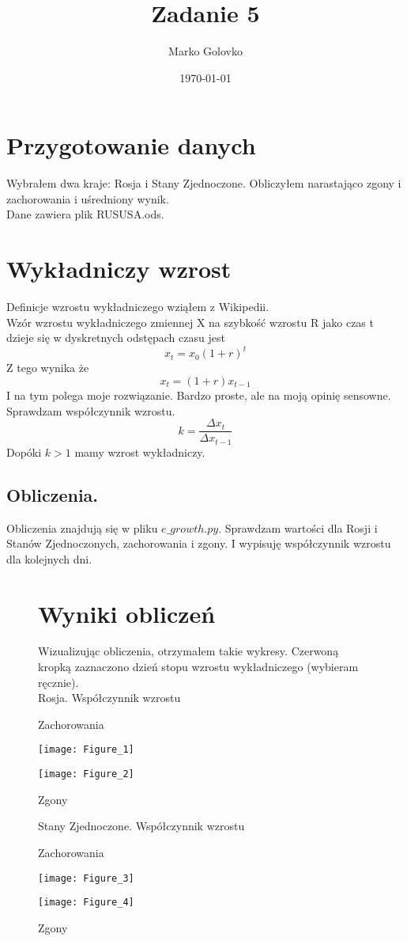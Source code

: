 \documentclass[12pt]{article}
\title{Zadanie 5}
\author{Marko Golovko}
\date{\today}
\begin{document}
\maketitle

\section*{Przygotowanie danych}
Wybrałem dwa kraje: Rosja i Stany Zjednoczone. Obliczyłem narastająco zgony i zachorowania i uśredniony wynik.\\
Dane zawiera plik RUSUSA.ods.

\section*{Wykładniczy wzrost}
Definicje wzrostu wykładniczego wziąłem z Wikipedii.\\
Wzór wzrostu wykładniczego zmiennej X na szybkość wzrostu R jako czas t dzieje się w dyskretnych odstępach czasu jest
$$ x_{t} = x_{0}(1 + r)^{t}$$
Z tego wynika że
$$ x_{t} = (1 + r)x_{t-1} $$
I na tym polega moje rozwiązanie. Bardzo proste, ale na moją opinię sensowne. Sprawdzam współczynnik wzrostu.
$$ k = \frac{\Delta x_{t}}{\Delta x_{t-1}} $$
Dopóki $k > 1$ mamy wzrost wykładniczy.

\subsection*{Obliczenia.}
Obliczenia znajdują się w pliku $e\_growth.py$. Sprawdzam wartości dla Rosji i Stanów Zjednoczonych, zachorowania i zgony.
I wypisuję współczynnik wzrostu dla kolejnych dni.


\begin{figure}[hbt!]
\section*{Wyniki obliczeń}
Wizualizując obliczenia, otrzymałem takie wykresy. Czerwoną kropką zaznaczono dzień stopu wzrostu wykładniczego (wybieram ręcznie). \\
\centering Rosja. Współczynnik wzrostu
 \centering
 \caption{Zachorowania}
 \texttt{[image: Figure\_1]}
 \caption{Zgony} 
 \texttt{[image: Figure\_2]}
 \begin{flushleft}
 \end{flushleft} 
\end{figure}

\begin{figure}[hbt!]
\centering Stany Zjednoczone. Współczynnik wzrostu
 \centering
 \caption{Zachorowania}
 \texttt{[image: Figure\_3]}
 \caption{Zgony} 
 \texttt{[image: Figure\_4]}
 \begin{flushleft}
 \end{flushleft} 
\end{figure}
\end{document}

